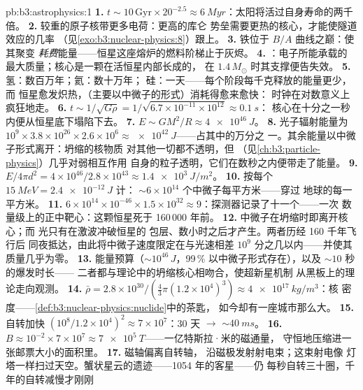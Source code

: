 \begin{solution}{pb:b3:astrophysics:1}
\textbf{1.} $t \sim 10\,\text{Gyr}\times20^{-2.5} \approx
\qty{6}{Myr}$：太阳将活过自身寿命的两千倍。
\textbf{2.} 较重的原子核带更多电荷：更高的库仑
势垒需要更热的核心，才能使隧道效应的几率
（见\cref{exo:b3:nuclear-physics:8}）跟上。
\textbf{3.} 铁位于 $B/A$ 曲线之巅：使其聚变
\emph{耗费}能量——恒星这座熔炉的燃料阶梯止于灰烬。
\textbf{4.} ：电子所能承载的
最大质量；核心是一颗在活恒星内部长成的，
在 $1.4\,M_\odot$ 时其支撑便告失效。
\textbf{5.} 氢：数百万年；氦：数十万年；
硅：一天——每个阶段每千克释放的能量更少，而
恒星愈发炽热，（主要以中微子的形式）消耗得愈来愈快：
时钟在对数意义上疯狂地走。
\textbf{6.} $t \sim 1/\sqrt{G\rho} =
1/\sqrt{6.7\times10^{-11}\times10^{12}} \approx \qty{0.1}{s}$：
核心在十分之一秒内便从恒星底下塌陷下去。
\textbf{7.} $E \sim GM^2/R \approx \qty{4e46}{J}$。
\textbf{8.} 光子辐射能量为 $10^9\times3.8\times10^{26}
\times2.6\times10^{6} \approx \qty{e42}{J}$——占其中的万分之
一。其余能量以中微子形式离开：坍缩的核物质
对其他一切都不透明，但
（见\cref{ch:b3:particle-physics}）几乎对弱相互作用
自身的粒子透明，它们在数秒之内便带走了能量。
\textbf{9.} $E/4\pi d^2 = 4\times10^{46}/2.8\times10^{43}
\approx \qty{1.4e3}{J/m^2}$。
\textbf{10.} 按每个 $\qty{15}{MeV} = \qty{2.4e-12}{J}$ 计：
${\sim}6\times10^{14}$ 个中微子每平方米——穿过
地球的每一平方米。
\textbf{11.} $6\times10^{14}\times10^{-46}\times1.5\times
10^{32} \approx 9$：探测器记录了十一个——一次
数量级上的正中靶心：这颗恒星死于
160\,000 年前。
\textbf{12.} 中微子在坍缩时即离开核心；而
光只有在激波冲破恒星的
包层、数小时之后才产生。两者历经 160 千年飞行后
同夜抵达，由此将中微子速度限定在与光速相差
$10^{9}$ 分之几以内——并使其质量几乎为零。
\textbf{13.} 能量预算（$\sim10^{46}\,\unit{J}$，99\,\%
以中微子形式存在），以及 ${\sim}10$ 秒的爆发时长——
二者都与理论中的坍缩核心相吻合，使超新星机制
从黑板上的理论走向观测。
\textbf{14.} $\bar\rho = 2.8\times10^{30}/(\tfrac43\pi
(1.2\times10^4)^3) \approx \qty{4e17}{kg/m^3}$：核
密度——\cref{def:b3:nuclear-physics:nuclide}中的茶匙，
如今却有一座城市那么大。
\textbf{15.} 自转加快 $(10^8/1.2\times10^4)^2 \approx
7\times10^{7}$：30 天 $\to$ ${\sim}\qty{40}{ms}$。
\textbf{16.} $B \approx 10^{-2}\times7\times10^{7} \approx
\qty{7e5}{T}$——一亿特斯拉·米的磁通量，
守恒地压缩进一张邮票大小的面积里。
\textbf{17.} 磁轴偏离自转轴，
沿磁极发射射电束；这束射电像
灯塔一样扫过天空。蟹状星云的遗迹——1054 年的客星——仍
每秒自转三十圈，千年的自转减慢才刚刚

\end{solution}
